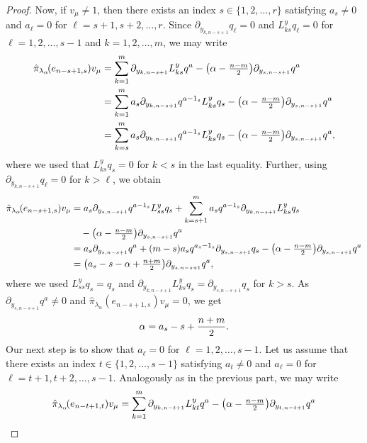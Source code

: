 \begin{proof}
Now, if $v_\mu \neq 1$, then there exists an index $s \in \{1,2,\dots,r\}$ satisfying $a_s \neq 0 $ and $a_\ell=0$ for $\ell=s+1,s+2,\dots,r$. Since $\partial_{y_{k,n-s+1}}q_\ell =0$ and $L^y_{ks}q_\ell=0$ for $\ell=1,2,\dots,s-1$ and $k=1,2,\dots,m$, we may write
\begin{align*}
   \hat{\pi}_{\lambda_\alpha}\!(e_{n-s+1,s})v_\mu &= \sum_{k=1}^m  \partial_{y_{k,n-s+1}} L^y_{ks}q^a - \big(\alpha - {\textstyle {n-m \over 2}} \big) \partial_{y_{s,n-s+1}}q^a \\
  &= \sum_{k=1}^m  a_s\partial_{y_{k,n-s+1}} q^{a-1_s}L^y_{ks}q_s - \big(\alpha - {\textstyle {n-m \over 2}} \big) \partial_{y_{s,n-s+1}}q^a \\
  &= \sum_{k=s}^m  a_s\partial_{y_{k,n-s+1}} q^{a-1_s}L^y_{ks}q_s - \big(\alpha - {\textstyle {n-m \over 2}} \big) \partial_{y_{s,n-s+1}}q^a,
\end{align*}
where we used that $L^y_{ks}q_s=0$ for $k<s$ in the last equality. Further, using $\partial_{y_{k,n-s+1}}q_\ell=0$ for $k > \ell$, we obtain
\begin{align*}
 \hat{\pi}_{\lambda_\alpha}\!(e_{n-s+1,s})v_\mu&= a_s\partial_{y_{s,n-s+1}} q^{a-1_s}L^y_{ss}q_s + \sum_{k=s+1}^m  a_s q^{a-1_s}\partial_{y_{k,n-s+1}}L^y_{ks}q_s \\
 & \quad - \big(\alpha - {\textstyle {n-m \over 2}} \big) \partial_{y_{s,n-s+1}}q^a \\
 &=a_s \partial_{y_{s,n-s+1}} q^a +(m-s)a_sq^{a_s-1_s}\partial_{y_{s,n-s+1}}q_s - \big(\alpha -{\textstyle {n-m \over 2}} \big) \partial_{y_{s,n-s+1}}q^a \\
 &= \big(a_s-s-\alpha+{\textstyle {n+m \over 2}}\big)\partial_{y_{s,n-s+1}}q^a,
\end{align*}
where we used $L^y_{ss}q_s=q_s$ and $\partial_{y_{k,n-s+1}}L^y_{ks}q_s=\partial_{y_{s,n-s+1}}q_s$ for $k>s$. As $\partial_{y_{s,n-s+1}}q^a \neq 0$ and $\hat{\pi}_{\lambda_\alpha}\!(e_{n-s+1,s})v_\mu=0$, we get
\begin{align}
  \alpha=a_s-s+{n+m \over 2}. \label{eq:weight alpha AGS}
\end{align}
Our next step is to show that $a_\ell=0$ for $\ell=1,2,\dots,s-1$. Let us assume that there exists an index $t \in \{1,2,\dots,s-1\}$ satisfying $a_t \neq 0$ and $a_\ell=0$ for $\ell=t+1,t+2,\dots,s-1$. Analogously as in the previous part, we may write
\begin{align*}
  \hat{\pi}_{\lambda_\alpha}\!(e_{n-t+1,t})v_\mu&= \sum_{k=1}^m  \partial_{y_{k,n-t+1}} L^y_{kt}q^a - \big(\alpha - {\textstyle {n-m \over 2}} \big)\partial_{y_{t,n-t+1}}q^a \\

\end{align*}
\end{proof}
